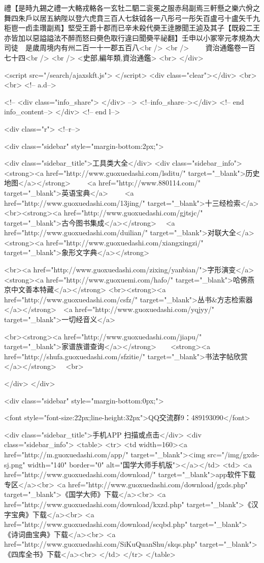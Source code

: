 禮【是時九錫之禮一大輅戎輅各一玄牡二駟二衮冕之服赤舄副焉三軒懸之樂六佾之舞四朱戶以居五納陛以登六虎賁三百人七鈇钺各一八彤弓一彤矢百盧弓十盧矢千九秬鬯一卣圭瓚副焉】堅受王爵十郡而已辛未殺代奰王逹滕聞王逌及其子【既殺二王亦皆加以惡謚謚法不醉而怒曰奰色取行違曰聞奰平祕翻】壬申以小冢宰元孝規為大司徒　是歲周境内有州二百一十一郡五百八<br />
<br />
　　資治通鑑卷一百七十四<br />
<br />
<史部,編年類,資治通鑑>  <br>
   </div> 

<script src="/search/ajaxskft.js"> </script>
 <div class="clear"></div>
<br>
<br>
 <!-- a.d-->

 <!--
<div class="info_share">
</div> 
-->
 <!--info_share--></div>   <!-- end info_content-->
  </div> <!-- end l-->

<div class="r">   <!--r-->



<div class="sidebar"  style="margin-bottom:2px;">

 
<div class="sidebar_title">工具类大全</div>
<div class="sidebar_info">
<strong><a href="http://www.guoxuedashi.com/lsditu/" target="_blank">历史地图</a></strong>　　
<a href="http://www.880114.com/" target="_blank">英语宝典</a>　　
<a href="http://www.guoxuedashi.com/13jing/" target="_blank">十三经检索</a>　
<br><strong><a href="http://www.guoxuedashi.com/gjtsjc/" target="_blank">古今图书集成</a></strong>　
<a href="http://www.guoxuedashi.com/duilian/" target="_blank">对联大全</a>　<strong><a href="http://www.guoxuedashi.com/xiangxingzi/" target="_blank">象形文字典</a></strong>　

<br><a href="http://www.guoxuedashi.com/zixing/yanbian/">字形演变</a>　　<strong><a href="http://www.guoxuemi.com/hafo/" target="_blank">哈佛燕京中文善本特藏</a></strong>
<br><strong><a href="http://www.guoxuedashi.com/csfz/" target="_blank">丛书&方志检索器</a></strong>　<a href="http://www.guoxuedashi.com/yqjyy/" target="_blank">一切经音义</a>　　

<br><strong><a href="http://www.guoxuedashi.com/jiapu/" target="_blank">家谱族谱查询</a></strong>　　<strong><a href="http://shufa.guoxuedashi.com/sfzitie/" target="_blank">书法字帖欣赏</a></strong>　
<br>

</div>
</div>


<div class="sidebar" style="margin-bottom:0px;">

<font style="font-size:22px;line-height:32px">QQ交流群9：489193090</font>


<div class="sidebar_title">手机APP 扫描或点击</div>
<div class="sidebar_info">
<table>
<tr>
	<td width=160><a href="http://m.guoxuedashi.com/app/" target="_blank"><img src="/img/gxds-sj.png" width="140"  border="0" alt="国学大师手机版"></a></td>
	<td>
<a href="http://www.guoxuedashi.com/download/" target="_blank">app软件下载专区</a><br>
<a href="http://www.guoxuedashi.com/download/gxds.php" target="_blank">《国学大师》下载</a><br>
<a href="http://www.guoxuedashi.com/download/kxzd.php" target="_blank">《汉字宝典》下载</a><br>
<a href="http://www.guoxuedashi.com/download/scqbd.php" target="_blank">《诗词曲宝典》下载</a><br>
<a href="http://www.guoxuedashi.com/SiKuQuanShu/skqs.php" target="_blank">《四库全书》下载</a><br>
</td>
</tr>
</table>

